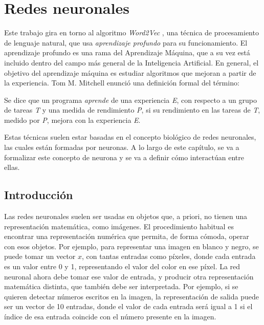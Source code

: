 \chapter{Redes neuronales}

Este trabajo gira en torno al algoritmo \textit{Word2Vec} \cite{word2vec:1} \cite{word2vec:2}, una técnica de procesamiento
de lenguaje natural, que usa \textit{aprendizaje profundo} para su funcionamiento. El aprendizaje
profundo es una rama del Aprendizaje Máquina, que a su vez está incluido dentro del campo más general
de la Inteligencia Artificial. En general, el objetivo del aprendizaje máquina es estudiar algoritmos
que mejoran a partir de la experiencia. Tom M. Mitchell \cite{mitchell1997} enunció una definición formal
del término:

\begin{definition}[Aprender]
    Se dice que un programa \textit{aprende} de una experiencia \textit{E}, con respecto a un grupo
    de tareas \textit{T} y una medida de rendimiento \textit{P}, si su rendimiento en las tareas de
    \textit{T}, medido por \textit{P}, mejora con la experiencia \textit{E}.
\end{definition}

Estas técnicas suelen estar basadas en el concepto biológico de redes neuronales, las cuales están formadas por neuronas. A lo largo de este capítulo, se va a formalizar este concepto de neurona y se va a definir cómo interactúan entre ellas.

\section{Introducción}

Las redes neuronales suelen ser usadas en objetos que, a priori, no tienen una representación matemática,
como imágenes. El procedimiento habitual es encontrar una representación numérica que permita, de forma
cómoda, operar con esos objetos. Por ejemplo, para representar una imagen en blanco y negro, se puede
tomar un vector $x$, con tantas entradas como píxeles, donde cada entrada es un valor entre 0 y 1,
representando el valor del color en ese píxel. La red neuronal ahora debe tomar ese valor de entrada,
y producir otra representación matemática distinta, que también debe ser interpretada. Por ejemplo,
si se quieren detectar números escritos en la imagen, la representación de salida puede ser un vector
de 10 entradas, donde el valor de cada entrada será igual a 1 si el índice de esa entrada coincide con
el número presente en la imagen.

